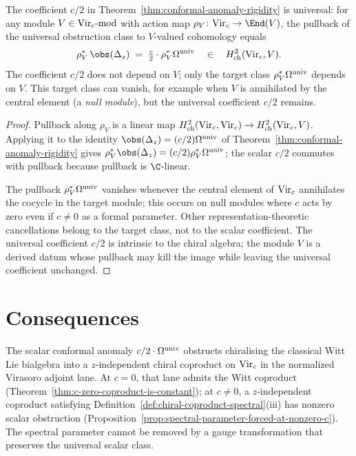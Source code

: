 \begin{theorem}
\label{thm:universal-coefficient}
\ClaimStatusProvedHere
The coefficient $c/2$ in Theorem~\ref{thm:conformal-anomaly-rigidity}
is universal: for any module $V \in \mathrm{Vir}_{c}\text{-mod}$ with action map
$\rho_{V}\colon \Virc \to \End(V)$, the pullback of the universal
obstruction class to $V$-valued cohomology equals
\[
\rho_{V}^{*}\, \obs(\Delta_{z})
\;=\;
\tfrac{c}{2} \cdot \rho_{V}^{*}\Cas
\quad \in \quad
\Hchtwo(\Virc, V).
\]
The coefficient $c/2$ does not depend on $V$; only the target class
$\rho_{V}^{*}\Omega^{\mathrm{univ}}$ depends on $V$. This target class can vanish, for
example when $V$ is annihilated by the central element (a \emph{null
module}), but the universal coefficient $c/2$ remains.
\end{theorem}

\begin{proof}
Pullback along $\rho_{V}$ is a linear map
$H^{2}_{\mathrm{ch}}(\mathrm{Vir}_{c}, \mathrm{Vir}_{c}) \to H^{2}_{\mathrm{ch}}(\mathrm{Vir}_{c}, V)$. Applying it to the
identity $\obs(\Delta_{z}) = (c/2)\Cas$ of
Theorem~\ref{thm:conformal-anomaly-rigidity} gives
$\rho_{V}^{*}\obs(\Delta_{z}) = (c/2) \rho_{V}^{*}\Cas$; the scalar
$c/2$ commutes with pullback because pullback is $\C$-linear.

The pullback $\rho_{V}^{*}\Omega^{\mathrm{univ}}$ vanishes whenever the central element
of $\mathrm{Vir}_{c}$ annihilates the cocycle in the target module; this occurs
on null modules where $c$ acts by zero even if $c \neq 0$ as a formal
parameter. Other representation-theoretic cancellations belong to
the target class, not to the scalar coefficient. The universal
coefficient $c/2$ is intrinsic to the chiral algebra; the module $V$
is a derived datum whose pullback may kill the image while leaving
the universal coefficient unchanged.
\end{proof}

\section{Consequences}
\label{sec:consequences-conformal-anomaly}

\begin{corollary}[Chiralisation is obstructed away from $c = 0$]
\label{cor:chiralization-obstructed-away-from-c-zero}
\ClaimStatusProvedHere
The scalar conformal anomaly $c/2 \cdot \Omega^{\mathrm{univ}}$ obstructs
chiralising the classical Witt Lie bialgebra into a
$z$-independent chiral coproduct on $\mathrm{Vir}_{c}$ in the normalized
Virasoro adjoint lane. At $c = 0$, that lane admits the Witt
coproduct (Theorem~\ref{thm:c-zero-coproduct-is-constant}); at
$c \neq 0$, a $z$-independent coproduct satisfying
Definition~\ref{def:chiral-coproduct-spectral}(iii) has nonzero
scalar obstruction (Proposition~\ref{prop:spectral-parameter-forced-at-nonzero-c}).
The spectral parameter cannot be removed by a gauge transformation
that preserves the universal scalar class.
\end{corollary}

